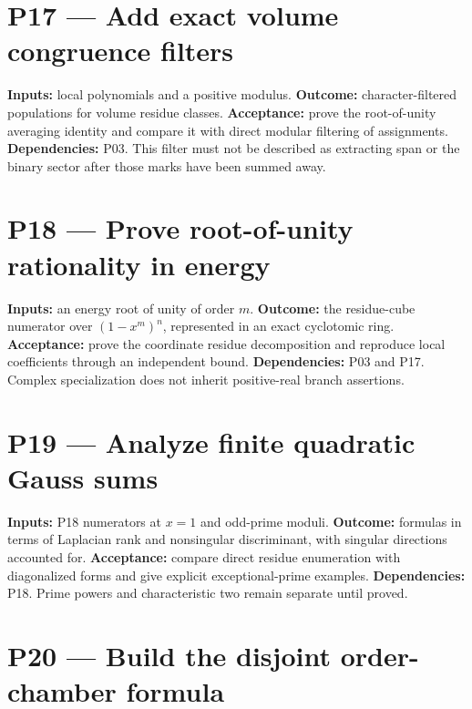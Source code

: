 \documentclass[
  11pt,
  a4paper,
]{report}
\begin{document}
\hypertarget{p17-add-exact-volume-congruence-filters}{%
\section{P17 --- Add exact volume congruence
filters}\label{p17-add-exact-volume-congruence-filters}}

\textbf{Inputs:} local polynomials and a positive modulus.
\textbf{Outcome:} character-filtered populations for volume residue
classes. \textbf{Acceptance:} prove the root-of-unity averaging identity
and compare it with direct modular filtering of assignments.
\textbf{Dependencies:} P03. This filter must not be described as
extracting span or the binary sector after those marks have been summed
away.

\hypertarget{p18-prove-root-of-unity-rationality-in-energy}{%
\section{P18 --- Prove root-of-unity rationality in
energy}\label{p18-prove-root-of-unity-rationality-in-energy}}

\textbf{Inputs:} an energy root of unity of order \(m\).
\textbf{Outcome:} the residue-cube numerator over \((1-x^m)^n\),
represented in an exact cyclotomic ring. \textbf{Acceptance:} prove the
coordinate residue decomposition and reproduce local coefficients
through an independent bound. \textbf{Dependencies:} P03 and P17.
Complex specialization does not inherit positive-real branch assertions.

\hypertarget{p19-analyze-finite-quadratic-gauss-sums}{%
\section{P19 --- Analyze finite quadratic Gauss
sums}\label{p19-analyze-finite-quadratic-gauss-sums}}

\textbf{Inputs:} P18 numerators at \(x=1\) and odd-prime moduli.
\textbf{Outcome:} formulas in terms of Laplacian rank and nonsingular
discriminant, with singular directions accounted for.
\textbf{Acceptance:} compare direct residue enumeration with
diagonalized forms and give explicit exceptional-prime examples.
\textbf{Dependencies:} P18. Prime powers and characteristic two remain
separate until proved.

\hypertarget{p20-build-the-disjoint-order-chamber-formula}{%
\section{P20 --- Build the disjoint order-chamber
formula}\label{p20-build-the-disjoint-order-chamber-formula}}
\end{document}
